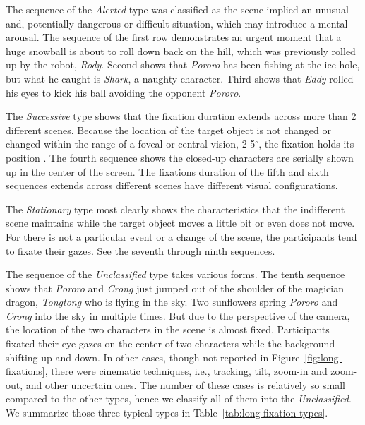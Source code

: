 \documentclass[oneside,master]{snueethesis}
\begin{document}
The sequence of the \textit{Alerted} type was classified as the scene implied an unusual and, potentially dangerous or difficult situation, which may introduce a mental arousal. The sequence of the first row demonstrates an urgent moment that a huge snowball is about to roll down back on the hill, which was previously rolled up by the robot, \textit{Rody}. Second shows that \textit{Pororo} has been fishing at the ice hole, but what he caught is \textit{Shark}, a naughty character. Third shows that \textit{Eddy} rolled his eyes to kick his ball avoiding the opponent \textit{Pororo}.

The \textit{Successive} type shows that the fixation duration extends across more than 2 different scenes. Because the location of the target object is not changed or changed within the range of a foveal or central vision, 2-5$^{\circ}$, the fixation holds its position \cite{mcmorris2014acquisition}. The fourth sequence shows the closed-up characters are serially shown up in the center of the screen. The fixations duration of the fifth and sixth sequences extends across different scenes have different visual configurations.

The \textit{Stationary} type most clearly shows the characteristics that the indifferent scene maintains while the target object moves a little bit or even does not move. For there is not a particular event or a change of the scene, the participants tend to fixate their gazes. See the seventh through ninth sequences.

The sequence of the \textit{Unclassified} type takes various forms. The tenth sequence shows that \textit{Pororo} and \textit{Crong} just jumped out of the shoulder of the magician dragon, \textit{Tongtong} who is flying in the sky. Two sunflowers spring \textit{Pororo} and \textit{Crong} into the sky in multiple times. But due to the perspective of the camera, the location of the two characters in the scene is almost fixed. Participants fixated their eye gazes on the center of two characters while the background shifting up and down. In other cases, though not reported in Figure~\ref{fig:long-fixations}, there were cinematic techniques, i.e., tracking, tilt, zoom-in and zoom-out, and other uncertain ones. The number of these cases is relatively so small compared to the other types, hence we classify all of them into the \textit{Unclassified}. We summarize those three typical types in Table~\ref{tab:long-fixation-types}.
\end{document}
